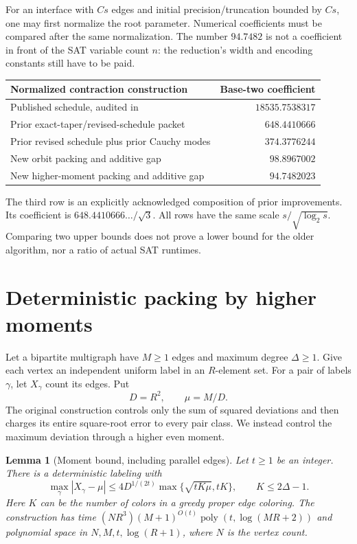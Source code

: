 \documentclass[11pt]{article}
\newtheorem{lemma}[theorem]{Lemma}
\theoremstyle{remark}\newtheorem{remark}[theorem]{Remark}
\newcommand{\poly}{\operatorname{poly}}
\newcommand{\lp}{\log_2}
\begin{document}
For an interface with $Cs$ edges and initial precision/truncation bounded by $Cs$, one may first normalize the root parameter. Numerical coefficients must be compared after the same normalization. The number $94.7482$ is not a coefficient in front of the SAT variable count $n$: the reduction's width and encoding constants still have to be paid.

\begin{center}
\begin{tabular}{@{}lr@{}}\toprule
Normalized contraction construction & Base-two coefficient\\\midrule
Published schedule, audited in \cite{contraction-packet} & $18535.7538317$\\
Prior exact-taper/revised-schedule packet & $648.4410666$\\
Prior revised schedule plus prior Cauchy modes & $374.3776244$\\
New orbit packing and additive gap & $98.8967002$\\
New higher-moment packing and additive gap & $94.7482023$\\\bottomrule
\end{tabular}
\end{center}

The third row is an explicitly acknowledged composition of prior improvements. Its coefficient is $648.4410666\ldots/\sqrt3$. All rows have the same scale $s/\sqrt{\lp s}$. Comparing two upper bounds does not prove a lower bound for the older algorithm, nor a ratio of actual SAT runtimes.

\section{Deterministic packing by higher moments}
\label{sec:moments}

Let a bipartite multigraph have $M\ge1$ edges and maximum degree $\Delta\ge1$. Give each vertex an independent uniform label in an $R$-element set. For a pair of labels $\gamma$, let $X_\gamma$ count its edges. Put
\[
 D=R^2,\qquad \mu=M/D.
\]
The original construction controls only the sum of squared deviations and then charges its entire square-root error to every pair class. We instead control the maximum deviation through a higher even moment.

\begin{lemma}[Moment bound, including parallel edges]
\label{lem:moment}
Let $t\ge1$ be an integer. There is a deterministic labeling with
\begin{equation}
 \max_\gamma |X_\gamma-\mu|
 \le 4D^{1/(2t)}\max\{\sqrt{tK\mu},tK\},
 \qquad K\le 2\Delta-1.
 \label{eq:moment-bound}
\end{equation}
Here $K$ can be the number of colors in a greedy proper edge coloring. The construction has time $(NR^3)(M+1)^{O(t)}\poly(t,\log(MR+2))$ and polynomial space in $N,M,t,\log(R+1)$, where $N$ is the vertex count.
\end{lemma}
\end{document}
